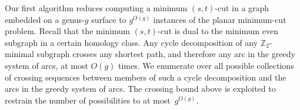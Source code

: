 \documentclass[natbib]{svcyclop}
\def\Z{\mathbb{Z}}
\begin{document}

Our first algorithm \cite{cen-mcshc-09} reduces computing a minimum $(s,t)$-cut in a graph embedded on a genus-$g$ surface to $g^{O(g)}$ instances of the planar minimum-cut problem.
Recall that the minimum $(s,t)$-cut is dual to the minimum even subgraph in a certain homology class.
Any cycle decomposition of any $\Z_2$-minimal subgraph crosses any shortest path, and therefore any arc in the greedy system of arcs, at most $O(g)$ times.
We enumerate over all possible collections of crossing sequences between members of such a cycle decomposition and the arcs in the greedy system of arcs.
The crossing bound above is exploited to restrain the number of possibilities to at most~$g^{O(g)}$.
\end{document}
